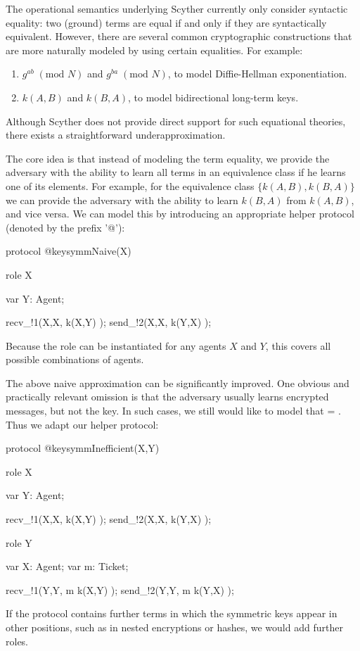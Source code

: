 \documentclass{book}
\begin{document}
The operational semantics underlying Scyther currently only consider
syntactic equality: two (ground) terms are equal if and only if they are
syntactically equivalent. However, there are several common
cryptographic constructions that are more naturally modeled by using certain
equalities. For example:
\begin{enumerate}
	\item $g^{ab} \; (\text{mod } N)$ and $g^{ba} \; (\text{mod }
		N)$, to model Diffie-Hellman exponentiation.
	\item $k(A,B)$ and $k(B,A)$, to model bidirectional long-term
		keys.
\end{enumerate}
Although Scyther does not provide direct support for such equational
theories, there exists a straightforward underapproximation.

The core idea is that instead of modeling the term equality, we
provide the adversary with the ability to learn all terms in an
equivalence class if he learns one of its elements.  For example, for
the equivalence class $\{ k(A,B), k(B,A) \}$ we can provide the
adversary with the ability to learn $k(B,A)$ from $k(A,B)$, and vice
versa. We can model this by introducing an appropriate helper protocol
(denoted by the prefix '@'):
\begin{spdl}
protocol @keysymmNaive(X) {
  role X {
    var Y: Agent;

    recv_!1(X,X,  k(X,Y)  );
    send_!2(X,X,  k(Y,X)  );
  }
}
\end{spdl}
Because the role can be instantiated for any agents $X$ and $Y$, this
covers all possible combinations of agents.

The above naive approximation can be significantly improved. One
obvious and practically relevant
omission is that the adversary usually learns encrypted messages, but
not the key. In such cases, we still would like to model
that  = . Thus we adapt our helper
protocol:
\begin{spdl}
protocol @keysymmInefficient(X,Y) {
  role X {
    var Y: Agent;

    recv_!1(X,X,  k(X,Y)  );
    send_!2(X,X,  k(Y,X)  );
  }
  role Y {
    var X: Agent;
    var m: Ticket;

    recv_!1(Y,Y,  { m }k(X,Y)  );
    send_!2(Y,Y,  { m }k(Y,X)  );
  }
}
\end{spdl}
If the protocol contains further terms in which the symmetric keys
appear in other positions, such as in nested encryptions or hashes, we
would add further roles.
\end{document}

